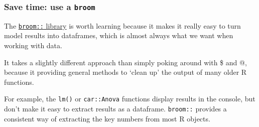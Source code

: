 \documentclass[]{article}
\newenvironment{Shaded}{\begin{snugshade}}{\end{snugshade}}
\newcommand{\CommentTok}[1]{\textcolor[rgb]{0.56,0.35,0.01}{\textit{#1}}}
\newcommand{\DataTypeTok}[1]{\textcolor[rgb]{0.13,0.29,0.53}{#1}}
\newcommand{\DecValTok}[1]{\textcolor[rgb]{0.00,0.00,0.81}{#1}}
\newcommand{\ErrorTok}[1]{\textcolor[rgb]{0.64,0.00,0.00}{\textbf{#1}}}
\newcommand{\FloatTok}[1]{\textcolor[rgb]{0.00,0.00,0.81}{#1}}
\newcommand{\KeywordTok}[1]{\textcolor[rgb]{0.13,0.29,0.53}{\textbf{#1}}}
\newcommand{\NormalTok}[1]{#1}
\newcommand{\OperatorTok}[1]{\textcolor[rgb]{0.81,0.36,0.00}{\textbf{#1}}}
\newcommand{\StringTok}[1]{\textcolor[rgb]{0.31,0.60,0.02}{#1}}
\begin{document}
\begin{Shaded}
\end{Shaded}

\hypertarget{broom}{%
\subsubsection*{\texorpdfstring{Save time: use a \texttt{broom}}{Save time: use a broom}}\label{broom}}

The \href{http://varianceexplained.org/r/broom-intro/}{\texttt{broom::} library} is worth
learning because it makes it really easy to turn model results into dataframes,
which is almost always what we want when working with data.

It takes a slightly different approach than simply poking around with \$ and @,
because it providing general methods to `clean up' the output of many older R
functions.

For example, the \texttt{lm()} or \texttt{car::Anova} functions display results in the
console, but don't make it easy to extract results as a dataframe. \texttt{broom::}
provides a consistent way of extracting the key numbers from most R objects.
\end{document}
